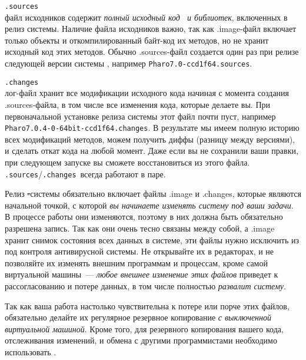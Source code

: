 \begin{description}
    \item{\verb|.sources|}\\ файл исходников содержит \emph{полный исходный код \ph\ и библиотек}, включенных в релиз системы.
    Наличие файла исходников важно, так как .image-файл включает только объекты и откомпилированный байт-код их методов, но не хранит
    исходный код этих методов. Обычно .sources-файл создается один раз при релизе следующей версии системы \ph, например
    \verb|Pharo7.0-ccd1f64.sources|.

    \item{\verb|.changes|}\\ лог-файл хранит все модификации исходного кода начиная с момента создания .sources-файла, в том числе все
    изменения кода, которые делаете вы. При первоначальной установке релиза системы этот файл почти пуст, например
    \verb|Pharo7.0.4-0-64bit-ccd1f64.changes|. В результате мы имеем полную историю всех модификаций методов, можем получить диффы
    (разницу между версиями), и сделать откат кода на любой момент. Даже если вы не сохранили ваши правки, при следующем запуске вы сможете восстановиться из этого файла.\\
    \verb|.sources|/\verb|.changes|\ всегда работают в паре.

\end{description}

Релиз \st-системы обязательно включает файлы .image и .changes, которые являются начальной точкой, с которой \emph{вы начинаете изменять
систему под ваши задачи}. В процессе работы они изменяются, поэтому в них должна быть обязательно разрешена запись. Так как они очень тесно
связаны между собой, а .image хранит снимок состояния всех данных в системе,
эти файлы нужно исключить из под контроля антивирусной системы. Не открывайте их в редакторах, и не позволяйте их изменять внешним
программам и процессам, кроме самой виртуальной машины\ --- \emph{любое внешнее изменение этих файлов} приведет к рассогласованию и потере данных,
в том числе полностью \emph{развалит систему}.

Так как ваша работа настолько чувствительна к потере или порче этих файлов, обязательно делайте их регулярное резервное копирование
\emph{с выключенной виртуальной машиной}. Кроме того, для резервного копирования вашего кода, отслеживания изменений, и обмена с другими
программистами необходимо использовать .


